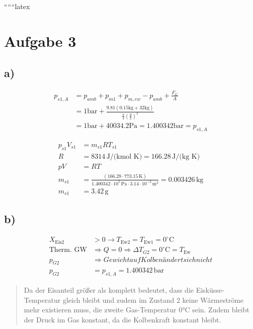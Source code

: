 
``````latex


\section*{Aufgabe 3}

\subsection*{a)}
\begin{align*}
p_{s1, A} &= p_{amb} + p_{m1} + p_{m, ew} - p_{amb} + \frac{F_G}{A} \\
&= 1 \text{bar} + \frac{9.81 (0.15 \text{kg} + 32 \text{kg})}{\frac{\pi}{4} \left( \frac{d}{2} \right)^2} \\
&= 1 \text{bar} + 40034.2 \text{Pa} = 1.400342 \text{bar} = p_{s1, A}
\end{align*}

\begin{align*}
p_{s1} V_{s1} &= m_{s1} R T_{s1} \\
R &= 8314 \, \text{J/(kmol K)} = 166.28 \, \text{J/(kg K)} \\
p V &= R T \\
m_{s1} &= \frac{(166.28 \cdot 773.15 \, \text{K})}{1.400342 \cdot 10^5 \, \text{Pa} \cdot 3.14 \cdot 10^{-2} \, \text{m}^3} = 0.003426 \, \text{kg} \\
m_{s1} &= 3.42 \, \text{g}
\end{align*}

\subsection*{b)}
\begin{align*}
X_{\text{Eis2}} &> 0 \rightarrow T_{\text{Ew2}} = T_{\text{Ew1}} = 0^\circ \text{C} \\
\text{Therm. GW} &\Rightarrow Q = 0 \Rightarrow \Delta T_{G2} = 0^\circ \text{C} = T_{\text{Ew}} \\
p_{G2} &\Rightarrow Gewicht auf Kolben ändert sich nicht \\
p_{G2} &= p_{s1, A} = 1.400342 \, \text{bar}
\end{align*}

\begin{quote}
Da der Eisanteil größer als komplett bedeutet, dass die Eisküsse-Temperatur gleich bleibt und zudem im Zustand 2 keine Wärmeströme mehr existieren muss, die zweite Gas-Temperatur 0°C sein. Zudem bleibt der Druck im Gas konstant, da die Kolbenkraft konstant bleibt.
\end{quote}

